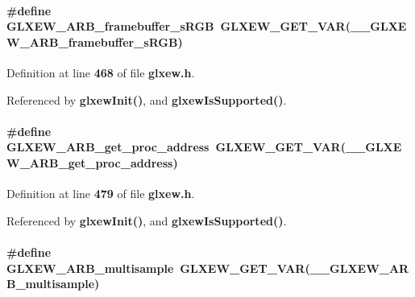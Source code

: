 \paragraph[{G\+L\+X\+E\+W\+\_\+\+A\+R\+B\+\_\+framebuffer\+\_\+s\+R\+GB}]{\setlength{\rightskip}{0pt plus 5cm}\#define G\+L\+X\+E\+W\+\_\+\+A\+R\+B\+\_\+framebuffer\+\_\+s\+R\+GB~{\bf G\+L\+X\+E\+W\+\_\+\+G\+E\+T\+\_\+\+V\+AR}({\bf \+\_\+\+\_\+\+G\+L\+X\+E\+W\+\_\+\+A\+R\+B\+\_\+framebuffer\+\_\+s\+R\+GB})}\label{glxew_8h_a4e5a470ec2d15f62b4995ac702bd856a}


Definition at line {\bf 468} of file {\bf glxew.\+h}.



Referenced by {\bf glxew\+Init()}, and {\bf glxew\+Is\+Supported()}.

\paragraph[{G\+L\+X\+E\+W\+\_\+\+A\+R\+B\+\_\+get\+\_\+proc\+\_\+address}]{\setlength{\rightskip}{0pt plus 5cm}\#define G\+L\+X\+E\+W\+\_\+\+A\+R\+B\+\_\+get\+\_\+proc\+\_\+address~{\bf G\+L\+X\+E\+W\+\_\+\+G\+E\+T\+\_\+\+V\+AR}({\bf \+\_\+\+\_\+\+G\+L\+X\+E\+W\+\_\+\+A\+R\+B\+\_\+get\+\_\+proc\+\_\+address})}\label{glxew_8h_ab97a6c40d571758468ab99b7101de9e5}


Definition at line {\bf 479} of file {\bf glxew.\+h}.



Referenced by {\bf glxew\+Init()}, and {\bf glxew\+Is\+Supported()}.

\paragraph[{G\+L\+X\+E\+W\+\_\+\+A\+R\+B\+\_\+multisample}]{\setlength{\rightskip}{0pt plus 5cm}\#define G\+L\+X\+E\+W\+\_\+\+A\+R\+B\+\_\+multisample~{\bf G\+L\+X\+E\+W\+\_\+\+G\+E\+T\+\_\+\+V\+AR}({\bf \+\_\+\+\_\+\+G\+L\+X\+E\+W\+\_\+\+A\+R\+B\+\_\+multisample})}\label{glxew_8h_a4d79576726b994c15104093f40bce2ce}


